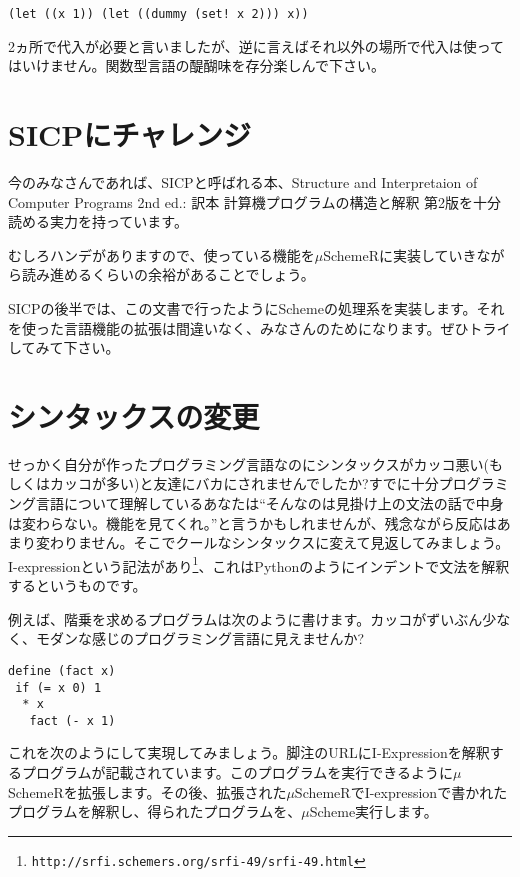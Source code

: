 \begin{lstlisting}
(let ((x 1)) (let ((dummy (set! x 2))) x))
\end{lstlisting}

2ヵ所で代入が必要と言いましたが、逆に言えばそれ以外の場所で代入は使って
はいけません。関数型言語の醍醐味を存分楽しんで下さい。

\section{SICPにチャレンジ}
今のみなさんであれば、SICPと呼ばれる本、Structure and Interpretaion of Computer Programs 2nd ed.: 訳本 計算機プログラムの構造と解釈 第2版\cite{SICP}を十分読める実力を持っています。

むしろハンデがありますので、使っている機能を$\mu$SchemeRに実装していきながら読み進めるくらいの余裕があることでしょう。

SICPの後半では、この文書で行ったようにSchemeの処理系を実装します。それを使った言語機能の拡張は間違いなく、みなさんのためになります。ぜひトライしてみて下さい。

\section{シンタックスの変更}
せっかく自分が作ったプログラミング言語なのにシンタックスがカッコ悪い(もしくはカッコが多い)と友達にバカにされませんでしたか?すでに十分プログラミング言語について理解しているあなたは“そんなのは見掛け上の文法の話で中身は変わらない。機能を見てくれ。”と言うかもしれませんが、残念ながら反応はあまり変わりません。そこでクールなシンタックスに変えて見返してみましょう。
I-expressionという記法があり\footnote{{\tt http://srfi.schemers.org/srfi-49/srfi-49.html}}、これはPythonのようにインデントで文法を解釈するというものです。 

例えば、階乗を求めるプログラムは次のように書けます。カッコがずいぶん少なく、モダンな感じのプログラミング言語に見えませんか?

\begin{lstlisting}
define (fact x)
 if (= x 0) 1
  * x
   fact (- x 1)
\end{lstlisting}

これを次のようにして実現してみましょう。脚注のURLにI-Expressionを解釈するプログラムが記載されています。このプログラムを実行できるように$\mu$SchemeRを拡張します。その後、拡張された$\mu$SchemeRでI-expressionで書かれたプログラムを解釈し、得られたプログラムを、$\mu$Scheme実行します。

